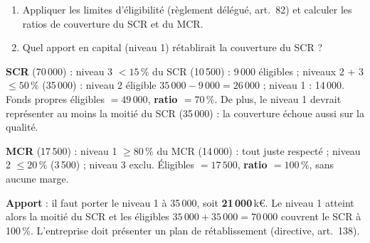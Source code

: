 \documentclass[11pt,a4paper]{article}
\newcommand{\keur}{\,k\euro}
\begin{document}
\begin{exercice}
\begin{enumerate}[nosep]
  \item Appliquer les limites d'éligibilité (règlement délégué, art.~82) et calculer les ratios de
        couverture du SCR et du MCR.
  \item Quel apport en capital (niveau 1) rétablirait la couverture du SCR ?
\end{enumerate}
\end{exercice}
\begin{corrige}
\textbf{SCR} (70\,000) : niveau 3 $< 15\,\%$ du SCR (10\,500) : 9\,000 éligibles ; niveaux 2 + 3
$\leq 50\,\%$ (35\,000) : niveau 2 éligible $35\,000 - 9\,000 = 26\,000$ ; niveau 1 : 14\,000.
Fonds propres éligibles $= 49\,000$, \textbf{ratio $= 70\,\%$}. De plus, le niveau 1 devrait
représenter au moins la moitié du SCR (35\,000) : la couverture échoue aussi sur la qualité.

\noindent\textbf{MCR} (17\,500) : niveau 1 $\geq 80\,\%$ du MCR (14\,000) : tout juste respecté ;
niveau 2 $\leq 20\,\%$ (3\,500) ; niveau 3 exclu. Éligibles $= 17\,500$,
\textbf{ratio $= 100\,\%$}, sans aucune marge.

\noindent\textbf{Apport} : il faut porter le niveau 1 à 35\,000, soit \textbf{21\,000}\keur. Le
niveau 1 atteint alors la moitié du SCR et les éligibles $35\,000 + 35\,000 = 70\,000$ couvrent
le SCR à 100\,\%. L'entreprise doit présenter un plan de rétablissement (directive, art.~138).
\end{corrige}
\end{document}
